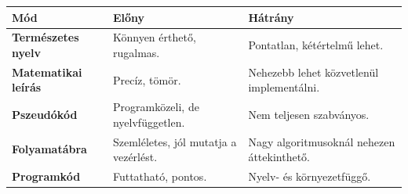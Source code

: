 \begin{tabularx}{\textwidth}{>{\bfseries}lXX}
Mód & Előny & Hátrány \\
\midrule
Természetes nyelv & Könnyen érthető, rugalmas. & Pontatlan, kétértelmű lehet. \\
Matematikai leírás & Precíz, tömör. & Nehezebb lehet közvetlenül implementálni. \\
Pszeudókód & Programközeli, de nyelvfüggetlen. & Nem teljesen szabványos. \\
Folyamatábra & Szemléletes, jól mutatja a vezérlést. & Nagy algoritmusoknál nehezen áttekinthető. \\
Programkód & Futtatható, pontos. & Nyelv- és környezetfüggő. \\
\end{tabularx}
